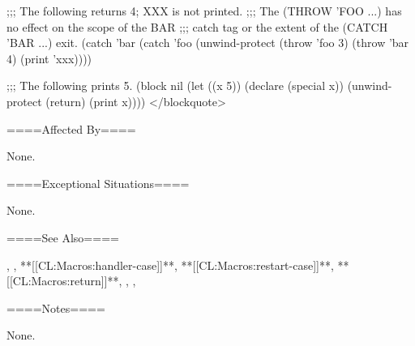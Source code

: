 ;;; The following returns 4; XXX is not printed. ;;; The (THROW 'FOO ...) has no effect on the scope of the BAR ;;; catch tag or the extent of the (CATCH 'BAR ...) exit. (catch 'bar (catch 'foo (unwind-protect (throw 'foo 3) (throw 'bar 4) (print 'xxx))))


;;; The following prints 5. (block nil (let ((x 5)) (declare (special x)) (unwind-protect (return) (print x)))) </blockquote>


====Affected By====

None.

====Exceptional Situations====

None.

====See Also====

, , **[[CL:Macros:handler-case]]**, **[[CL:Macros:restart-case]]**, **[[CL:Macros:return]]**, , , {\secref\Evaluation}

====Notes====

None.

 
